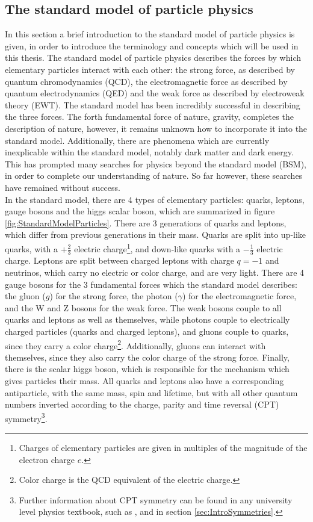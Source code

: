 \subsection{The standard model of particle physics}
In this section a brief introduction to the standard model of particle physics is given, in order to introduce the terminology and concepts which will be used in this thesis. 
The standard model of particle physics describes the forces by which elementary particles interact with each other: the strong force, as described by quantum chromodynamics (QCD), the electromagnetic force as described by quantum electrodynamics (QED) and the weak force as described by electroweak theory (EWT). The standard model has been incredibly successful in describing the three forces. The forth fundamental force of nature, gravity, completes the description of nature, however, it remains unknown how to incorporate it into the standard model. Additionally, there are phenomena which are currently inexplicable within the standard model, notably dark matter and dark energy. This has prompted many searches for physics beyond the standard model (BSM), in order to complete our understanding of nature. So far however, these searches have remained without success. \\

In the standard model, there are 4 types of elementary particles: quarks, leptons, gauge bosons and the higgs scalar boson, which are summarized in figure \ref{fig:StandardModelParticles}. There are 3 generations of quarks and leptons, which differ from previous generations in their mass. Quarks are split into up-like quarks, with a $+\frac{2}{3}$ electric charge\footnote{Charges of elementary particles are given in multiples of the magnitude of the electron charge $e$.}, and down-like quarks with a $-\frac{1}{3}$ electric charge. Leptons are split between charged leptons with charge $q=-1$ and neutrinos, which carry no electric or color charge, and are very light. There are 4 gauge bosons for the 3 fundamental forces which the standard model describes: the gluon ($g$) for the strong force, the photon ($\gamma$) for the electromagnetic force, and the W and Z bosons for the weak force. The weak bosons couple to all quarks and leptons as well as themselves, while photons couple to electrically charged particles (quarks and charged leptons), and gluons couple to quarks, since they carry a color charge\footnote{Color charge is the QCD equivalent of the electric charge.}. Additionally, gluons can interact with themselves, since they also carry the color charge of the strong force.
Finally, there is the scalar higgs boson, which is responsible for the mechanism which gives particles their mass.
All quarks and leptons also have a corresponding antiparticle, with the same mass, spin and lifetime, but with all other quantum numbers inverted according to the charge, parity and time reversal (CPT) symmetry\footnote{Further information about CPT symmetry can be found in any university level physics textbook, such as \cite{Physics_from_symmetry}, and in section \ref{sec:IntroSymmetries}.}. \\

